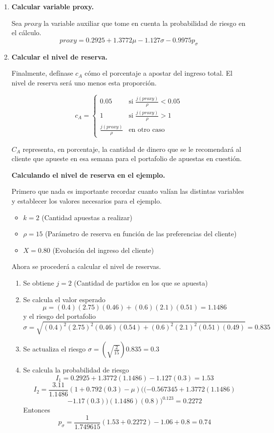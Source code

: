 \begin{enumerate}
	
	\item \textbf{Calcular variable proxy.}
	
	 Sea $proxy$ la variable auxiliar que tome en cuenta la probabilidad de riesgo en el cálculo.
	 \[proxy = 0.2925 + 1.3772\mu -1.127\sigma - 0.9975p_\sigma\]
	
	\item \textbf{Calcular el nivel de reserva.}
	
	Finalmente, defínase $c_A$ cómo el porcentaje a apostar del ingreso total. El nivel de reserva será uno menos esta proporción.
	
	\begin{equation*}
	    c_A = \begin{cases}
	               0.05            & \text{si } \frac{j(proxy)}{\rho} < 0.05\\
	               1               & \text{si } \frac{j(proxy)}{\rho} >1\\
	              	\frac{j(proxy)}{\rho} & \text{en otro caso}
	           \end{cases}
	\end{equation*}
	
	$C_A$ representa, en porcentaje, la cantidad de dinero que se le recomendará al cliente que apueste en esa semana para el portafolio de apuestas en cuestión.
	
	\textbf{Calculando el nivel de reserva en el ejemplo.}
	
	Primero que nada es importante recordar cuanto valían las distintas variables y establecer los valores necesarios para el ejemplo.
	\begin{itemize}
		\item $k = 2$ (Cantidad apuestas a realizar)
		\item $\rho = 15$ (Parámetro de reserva en función de las preferencias del cliente)
		\item $X = 0.80$ (Evolución del ingreso del cliente)		
	\end{itemize}
	Ahora se procederá a calcular el nivel de reservas.
	\begin{enumerate}
		\item Se obtiene $j = 2$ (Cantidad de partidos en los que se apuesta)
		\item Se calcula el valor esperado 
		\[\mu = (0.4)(2.75)(0.46) + (0.6)(2.1)(0.51) = 1.1486\] 
		y el riesgo del portafolio 
		\[\sigma = \sqrt{(0.4)^2(2.75)^2(0.46)(0.54)+(0.6)^2(2.1)^2(0.51)(0.49)} = 0.835\]
		\item Se actualiza el riesgo $\sigma = \left(\sqrt{\frac{2}{15}}\right)0.835 = 0.3$
		\item Se calcula la probabilidad de riesgo
		\[I_1 = 0.2925 +1.3772(1.1486) - 1.127(0.3) = 1.53\]
		\[I_2 = \frac{3.11}{1.1486}(1 + 0.792(0.3) - \mu)((-0.567345 + 1.3772(1.1486)\]
		\[-1.17(0.3))(1.1486)(0.8))^{0.123} = 0.2272\]
		Entonces
		\[p_\sigma = \frac{1}{1.749615}(1.53 + 0.2272) - 1.06 + 0.8 = 0.74\]
		

\end{enumerate}
\end{enumerate}
